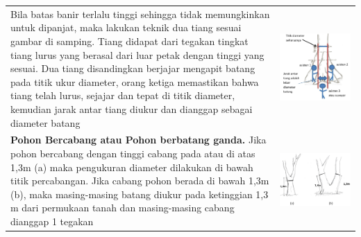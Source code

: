 \documentclass[
  oneside]{book}
\begin{document}
\begin{longtable}[]{@{}
  >{\raggedright\arraybackslash}p{}
  >{\raggedright\arraybackslash}p{}@{}}
Bila batas banir terlalu tinggi sehingga tidak memungkinkan untuk dipanjat, maka lakukan teknik dua tiang sesuai gambar di samping. Tiang didapat dari tegakan tingkat tiang lurus yang berasal dari luar petak dengan tinggi yang sesuai. Dua tiang disandingkan berjajar mengapit batang pada titik ukur diameter, orang ketiga memastikan bahwa tiang telah lurus, sejajar dan tepat di titik diameter, kemudian jarak antar tiang diukur dan dianggap sebagai diameter batang & \includegraphics{images/vtb6.jpg} \\
\textbf{Pohon Bercabang atau Pohon berbatang ganda.} Jika pohon bercabang dengan tinggi cabang pada atau di atas 1,3m (a) maka pengukuran diameter dilakukan di bawah titik percabangan. Jika cabang pohon berada di bawah 1,3m (b), maka masing-masing batang diukur pada ketinggian 1,3 m dari permukaan tanah dan masing-masing cabang dianggap 1 tegakan & \includegraphics{images/vtb7.jpg} \\

\end{longtable}
\end{document}

